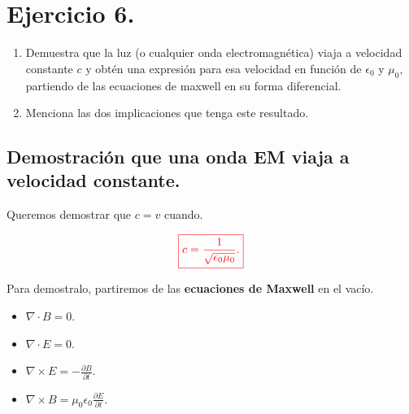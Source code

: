 \documentclass[a4paper,12pt]{article} %
\begin{document}
\section{Ejercicio 6.}

\vspace{\baselineskip}

\begin{enumerate}
    \item Demuestra que la luz (o cualquier onda electromagnética) viaja a velocidad constante \(c\) y obtén una expresión para esa 
    velocidad en función de \(\epsilon_0\) y \(\mu_0\), partiendo de las ecuaciones de maxwell en su forma diferencial.
    
    \item Menciona las dos implicaciones que tenga este resultado.
\end{enumerate}

\vspace{\baselineskip}

\subsection{Demostración que una onda EM viaja a velocidad constante. }

\vspace{\baselineskip}

\begin{justify}
    Queremos demostrar que \(c = v\) cuando.
\end{justify}

\vspace{\baselineskip}

\[\textcolor{red}{\boxed{ c = \frac{1}{\sqrt{\epsilon_0 \mu_0}}.}} \]

\newpage

\begin{justify}
    Para demostralo, partiremos de las \textbf{ecuaciones de Maxwell} en el vacío.
\end{justify}

\begin{itemize}
    \item \( \nabla \cdot B = 0. \)
    \item \( \nabla \cdot E  = 0. \)
    \item \( \nabla \times E = - \frac{\partial B}{\partial t}. \)
    \item \( \nabla \times B = \mu_0 \epsilon_0 \frac{\partial E}{\partial t}. \)
\end{itemize}
\end{document}

